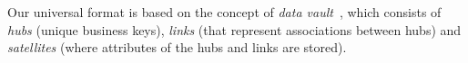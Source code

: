 Our universal format is based on the concept of \emph{data vault}~\cite{Inmon2015}, which consists of \emph{hubs} (unique business keys), \emph{links} (that represent associations between hubs) and \emph{satellites} (where attributes of the hubs and links are stored). 
%
%
%
